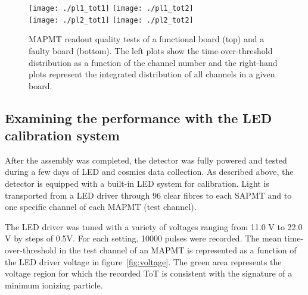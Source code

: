 \documentclass[a4paper,11pt]{article}
\begin{document}
\begin{figure}[htb]
 \centering
 \texttt{[image: ./pl1\_tot1]}
 \texttt{[image: ./pl1\_tot2]}\\
 \texttt{[image: ./pl2\_tot1]}
 \texttt{[image: ./pl2\_tot2]}
 \caption[Electronics quality tests]{MAPMT readout quality tests of a functional board (top) and a faulty board (bottom). The left plots show the 
 time-over-threshold distribution as a function of the channel number and the right-hand plots represent the integrated distribution of all channels
 in a given board.}
 \label{fig:tot_feb_dbb_test}
\end{figure}

\subsection{Examining the performance with the LED calibration system}\label{sec:led_perf}
After the assembly was completed, the detector was fully powered and tested during a few days of LED and cosmics data collection. As described above,
the detector is equipped with a built-in LED system for calibration.  Light is transported from a LED driver through 96 clear fibres to each SAPMT and to
one specific channel of each MAPMT (test channel). 

The LED driver was tuned with a variety of voltages ranging from 11.0 V to 22.0 V by steps of 0.5V. For each setting, 10000 pulses were recorded. The
mean time-over-threshold in the test channel of an MAPMT is represented as a function of the LED driver voltage in figure~\ref{fig:voltage}. The green
area represents the voltage region for which the recorded ToT is consistent with the signature of a minimum ionizing particle.
\end{document}
